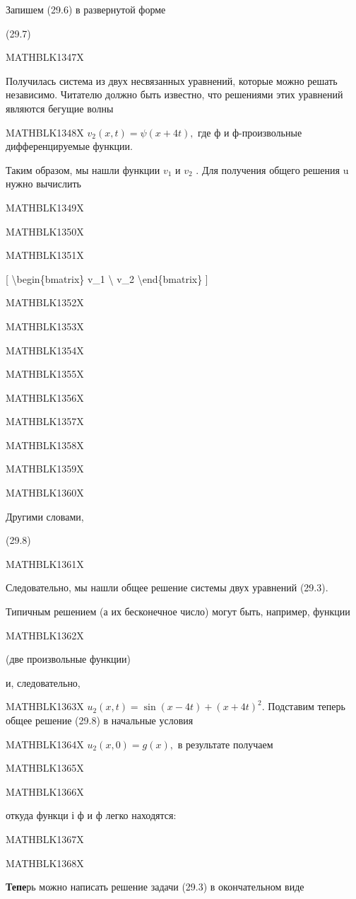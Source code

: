\documentclass[
]{article}
\begin{document}
Запишем (29.6) в развернутой форме

(29.7)

MATHBLK1347X

Получилась система из двух несвязанных уравнений, которые можно решать
независимо. Читателю должно быть известно, что решениями этих уравнений
являются бегущие волны

MATHBLK1348X \(v_2(x, t) = \psi(x+4t),\) где ф и ф-произвольные
дифференцируемые функции.

Таким образом, мы нашли функции \(v_1\) и \(v_2\) . Для получения общего
решения u нужно вычислить

MATHBLK1349X

MATHBLK1350X

MATHBLK1351X

{[} \textbackslash begin\{bmatrix\} v\_1 \textbackslash{} v\_2
\textbackslash end\{bmatrix\} {]}

MATHBLK1352X

MATHBLK1353X

MATHBLK1354X

MATHBLK1355X

MATHBLK1356X

MATHBLK1357X

MATHBLK1358X

MATHBLK1359X

MATHBLK1360X

Другими словами,

(29.8)

MATHBLK1361X

Следовательно, мы нашли общее решение системы двух уравнений (29.3).

Типичным решением (а их бесконечное число) могут быть, например, функции

MATHBLK1362X

(две произвольные функции)

и, следовательно,

MATHBLK1363X \(u_2(x, t) = \sin(x-4t) + (x+4t)^2.\) Подставим теперь
общее решение (29.8) в начальные условия

MATHBLK1364X \(u_2(x, 0) = g(x),\) в результате получаем

MATHBLK1365X

MATHBLK1366X

откуда функци і ф и ф легко находятся:

MATHBLK1367X

MATHBLK1368X

\textbf{Тепе}рь можно написать решение задачи (29.3) в окончательном
виде
\end{document}
